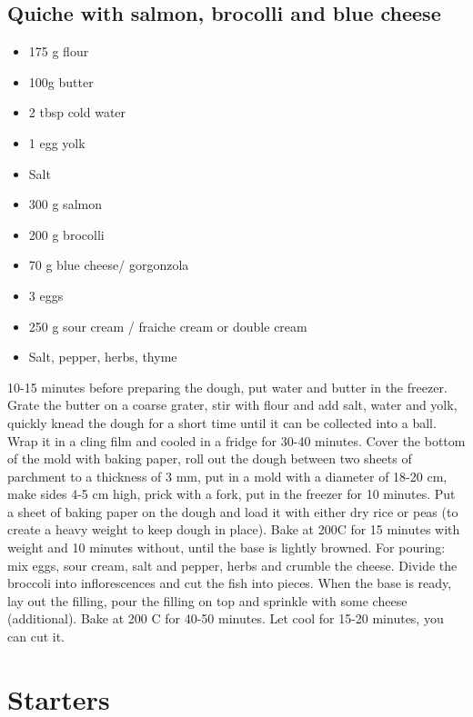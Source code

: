 \documentclass[
]{book}
\begin{document}
\hypertarget{quiche-with-salmon-brocolli-and-blue-cheese}{%
\section{Quiche with salmon, brocolli and blue cheese}\label{quiche-with-salmon-brocolli-and-blue-cheese}}

\begin{itemize}
\item
  175 g flour
\item
  100g butter
\item
  2 tbsp cold water
\item
  1 egg yolk
\item
  Salt
\item
  300 g salmon
\item
  200 g brocolli
\item
  70 g blue cheese/ gorgonzola
\item
  3 eggs
\item
  250 g sour cream / fraiche cream or double cream
\item
  Salt, pepper, herbs, thyme
\end{itemize}

10-15 minutes before preparing the dough, put water and butter in the freezer.
Grate the butter on a coarse grater, stir with flour and add salt, water and yolk, quickly knead the dough for a short time until it can be collected into a ball. Wrap it in a cling film and cooled in a fridge for 30-40 minutes.
Cover the bottom of the mold with baking paper, roll out the dough between two sheets of parchment to a thickness of 3 mm, put in a mold with a diameter of 18-20 cm, make sides 4-5 cm high, prick with a fork, put in the freezer for 10 minutes.
Put a sheet of baking paper on the dough and load it with either dry rice or peas (to create a heavy weight to keep dough in place). Bake at 200C for 15 minutes with weight and 10 minutes without, until the base is lightly browned.
For pouring: mix eggs, sour cream, salt and pepper, herbs and crumble the cheese. Divide the broccoli into inflorescences and cut the fish into pieces.
When the base is ready, lay out the filling, pour the filling on top and sprinkle with some cheese (additional). Bake at 200 C for 40-50 minutes. Let cool for 15-20 minutes, you can cut it.

\hypertarget{starters}{%
\chapter{Starters}\label{starters}}
\end{document}
